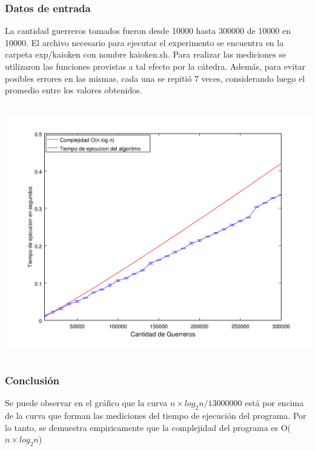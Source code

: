     \subsubsection*{Datos de entrada}
    La cantidad guerreros tomados fueron  desde 10000 hasta 300000 de 10000 en 10000.
    El archivo necesario para ejecutar el experimento se encuentra en la carpeta exp/kaioken con nombre kaioken.sh. 
		Para realizar las mediciones se  utilizaron las funciones provistas a tal efecto por la cátedra. Además, para evitar posibles errores en las mismas, cada una se repitió 7 veces, considerando luego el promedio entre los valores obtenidos. 



      \includegraphics[height=11cm]{graficos/kaioken-exp.png}



		\subsubsection*{Conclusión}
			Se puede observar en el gráfico que la curva $n \times log_{2}n / 13000000$ está por encima de la curva que forman las mediciones del tiempo de ejecución del programa. Por lo tanto, se demuestra empiricamente que la complejidad del programa es O($n \times log_{2}n$)
